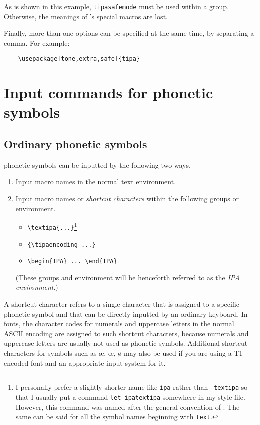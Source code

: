 As is shown in this example, \texttt{\tbs tipasafemode} must be used
within a group. Otherwise, the meanings of \tipa{}'s special macros
are lost.

Finally, more than one options can be specified at the same
time, by separating a comma. For example:

\begin{verbatim}
    \usepackage[tone,extra,safe]{tipa}
\end{verbatim}

\section{Input commands for phonetic symbols}
\subsection{Ordinary phonetic symbols}\label{sec:OrdinarySymbol}

\tipa{} phonetic symbols can be inputted by the following two ways.

\begin{enumerate}
\itemsep0pt
\item Input macro names in the normal text environment.
\item Input macro names or \emph{shortcut characters} with\-in the
  following groups or environment.
  \begin{itemize}
  \item \verb|\textipa{...}|\footnote{I personally prefer a slightly
      shorter name like \texttt{\tbs ipa} rather than \texttt{\tbs
        textipa} so that I usually put a command \texttt{\tbs let\tbs
        ipa\tbs textipa} somewhere in my style file. However, this
      command was named after the general convention of \LaTeXe. The
      same can be said for all the symbol names beginning with
      \texttt{\tbs text}.}
  \item \verb|{\tipaencoding ...}|
  \item \verb|\begin{IPA} ... \end{IPA}|
  \end{itemize}
  (These groups and environment will be henceforth referred to as the
  \textsl{IPA environment}.)
\end{enumerate}

A shortcut character refers to a single character that is assigned to
a specific phonetic symbol and that can be directly inputted by an
ordinary keyboard. In \tipa{} fonts, the character codes for numerals
and uppercase letters in the normal ASCII encoding are assigned to such
shortcut characters, because numerals and uppercase letters are
usually not used as phonetic symbols.  Additional shortcut
characters for symbols such as \ae{}, \oe{}, \o{} may also be used if
you are using a T1 encoded font and an appropriate input system for
it.

